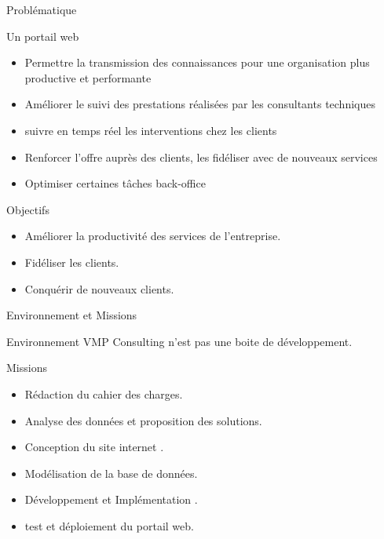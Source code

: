 \documentclass[french]{beamer}
\begin{document}
\begin{frame}{Problématique}
	
    \begin{alertblock}{Un portail web}
    \begin{itemize}

 \item   Permettre la transmission des connaissances pour une organisation plus productive et performante
 \item     Améliorer le suivi des prestations réalisées par les consultants techniques 
 \item suivre en temps réel les interventions chez les clients
 
 \item   Renforcer  l'offre auprès des clients, les fidéliser avec de nouveaux services
 \item   Optimiser certaines tâches back-office 
\end{itemize}
   
	\end{alertblock} 
	\pause
	 \begin{alertblock}{Objectifs}
    \begin{itemize}

\item Améliorer la productivité des services de l'entreprise.
\item Fidéliser les clients.

\item Conquérir de nouveaux clients.
\end{itemize}
   
	\end{alertblock}   	
	
\end{frame}


\begin{frame}{Environnement et Missions}
	
	\begin{block}{Environnement}
	VMP Consulting n'est pas une boite de développement.
	\end{block}
	
	\begin{block}{Missions}
        	
	\begin{itemize}
\item Rédaction  du cahier des charges.
\item Analyse des données et proposition des solutions.
\item Conception  du site internet .  
\item Modélisation de la base de données.
\item Développement et Implémentation .
\item test et déploiement du portail web.
\end{itemize}
	
	\end{block}
	
	
\end{frame}
\end{document}
